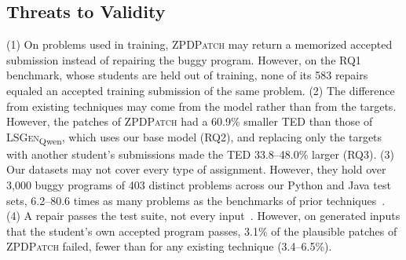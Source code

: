 \documentclass[conference]{IEEEtran}
\begin{document}
\subsection{Threats to Validity}
(1) On problems used in training, \textsc{ZPDPatch} may return a memorized accepted submission instead of repairing the buggy program. However, on the RQ1 benchmark, whose students are held out of training, none of its 583 repairs equaled an accepted training submission of the same problem. (2) The difference from existing techniques may come from the model rather than from the targets. However, the patches of \textsc{ZPDPatch} had a 60.9\% smaller TED than those of \textsc{LSGen}\textsubscript{Qwen}, which uses our base model (RQ2), and replacing only the targets with another student's submissions made the TED 33.8--48.0\% larger (RQ3). (3) Our datasets may not cover every type of assignment. However, they hold over 3,000 buggy programs of 403 distinct problems across our Python and Java test sets, 6.2--80.6 times as many problems as the benchmarks of prior techniques~\cite{hu2019re,xie2024brafar,dai2026learner}. (4) A repair passes the test suite, not every input~\cite{smith2015cure}. However, on generated inputs that the student's own accepted program passes, 3.1\% of the plausible patches of \textsc{ZPDPatch} failed, fewer than for any existing technique (3.4--6.5\%).
\end{document}
